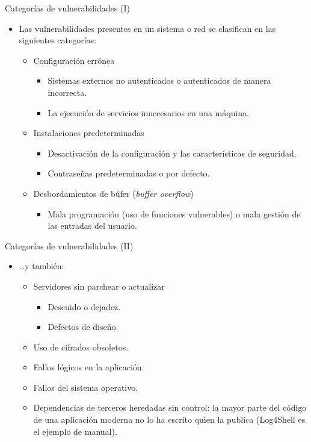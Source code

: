 \documentclass[aspectratio=169,11pt]{beamer}
\begin{document}
\begin{frame}{Categorías de vulnerabilidades (I)}
\small
  \begin{itemize}
  \item Las vulnerabilidades presentes en un sistema o red se clasifican en las siguientes categorías:
    \begin{itemize}\setlength{\itemsep}{0.35em}
    \item Configuración errónea
      \begin{itemize}
      \item Sistemas externos no autenticados o autenticados de manera incorrecta.
      \item La ejecución de servicios innecesarios en una máquina.
      \end{itemize}
    \item Instalaciones predeterminadas
      \begin{itemize}
      \item Desactivación de la configuración y las características de seguridad.
      \item Contraseñas predeterminadas o por defecto.
      \end{itemize}
    \item Desbordamientos de búfer (\emph{buffer overflow})
      \begin{itemize}
      \item Mala programación (uso de funciones vulnerables) o mala gestión de las entradas del usuario.
      \end{itemize}
    \end{itemize}
  \end{itemize}
\end{frame}

\begin{frame}{Categorías de vulnerabilidades (II)}
\small
  \begin{itemize}
  \item \dots y también:
    \begin{itemize}\setlength{\itemsep}{0.35em}
    \item Servidores sin parchear o actualizar
      \begin{itemize}
      \item Descuido o dejadez.
      \item Defectos de diseño.
      \end{itemize}
    \item Uso de cifrados obsoletos.
    \item Fallos lógicos en la aplicación.
    \item Fallos del sistema operativo.
    \item Dependencias de terceros heredadas sin control: la mayor parte del código de una aplicación moderna no lo ha escrito quien la publica (Log4Shell es el ejemplo de manual).
    \end{itemize}
  \end{itemize}
\end{frame}
\end{document}
